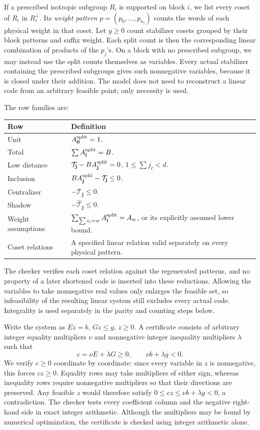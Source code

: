 \documentclass[11pt]{article}
\theoremstyle{definition}
\theoremstyle{remark}
\begin{document}
If a prescribed isotropic subgroup \(R_i\) is supported on block \(i\),
we list every coset of \(R_i\) in \(R_i^\perp\). Its \emph{weight
pattern} \(p=(p_0,\ldots,p_{n_i})\) counts the words of each physical
weight in that coset. Let \(y\geq0\) count stabilizer cosets grouped by
their block patterns and suffix weight. Each split count is then the
corresponding linear combination of products of the \(p_j\)'s. On a
block with no prescribed subgroup, we may instead use the split counts
themselves as variables. Every actual stabilizer containing the
prescribed subgroups gives such nonnegative variables, because it is
closed under their addition. The model does not need to reconstruct a
linear code from an arbitrary feasible point; only necessity is used.

The row families are:
\begin{center}\small
\begin{tabularx}{\linewidth}{@{}lX@{}}\toprule
Row&Definition\\\midrule
Unit&\(A^{\rm split}_{\mathbf0}=1\).\\
Total&\(\sum A^{\rm split}_{\mathbf i}=B\).\\
Low distance&\(\mathcal T_{\mathbf j}-BA^{\rm split}_{\mathbf j}=0\), \(1\leq\sum j_\ell<d\).\\
Inclusion&\(BA^{\rm split}_{\mathbf j}-\mathcal T_{\mathbf j}\leq0\).\\
Centralizer&\(-\mathcal T_{\mathbf j}\leq0\).\\
Shadow&\(-\widehat{\mathcal T}_{\mathbf j}\leq0\).\\
Weight assumptions&\(\sum_{\sum i_\ell=w}A^{\rm split}_{\mathbf i}=A_w\), or its explicitly assumed lower bound.\\
Coset relations&A specified linear relation valid separately on every physical pattern.\\\bottomrule
\end{tabularx}
\end{center}
The checker verifies each coset relation against the regenerated
patterns, and no property of a later shortened code is inserted into
these reductions. Allowing the variables to take nonnegative real values
only enlarges the feasible set, so infeasibility of the resulting linear
system still excludes every actual code. Integrality is used separately
in the parity and counting steps below.

Write the system as \(Ez=b\), \(Gz\leq g\), \(z\geq0\). A certificate
consists of arbitrary integer equality multipliers \(\nu\) and
nonnegative integer inequality multipliers \(\lambda\) such that
\[
 c=\nu E+\lambda G\geq0,\qquad \nu b+\lambda g<0.
\]
We verify \(c\geq0\) coordinate by coordinate: since every variable in
\(z\) is nonnegative, this forces \(cz\geq0\). Equality rows may take
multipliers of either sign, whereas inequality rows require nonnegative
multipliers so that their directions are preserved. Any feasible \(z\)
would therefore satisfy \(0\leq cz\leq\nu b+\lambda g<0\), a
contradiction. The checker tests every coefficient column and the
negative right-hand side in exact integer arithmetic. Although the
multipliers may be found by numerical optimization, the certificate is
checked using integer arithmetic alone.
\end{document}

